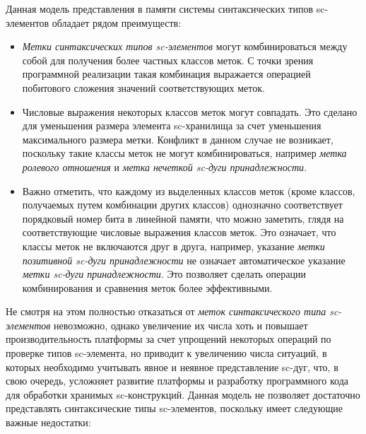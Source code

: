 Данная модель представления в памяти системы синтаксических типов sc-элементов обладает рядом преимуществ:
\begin{itemize}
    \item \textit{Метки синтаксических типов sc-элементов} могут комбинироваться между собой для получения более
    частных классов меток. С точки зрения программной реализации такая комбинация выражается операцией побитового
    сложения значений соответствующих меток.
    \item Числовые выражения некоторых классов меток могут совпадать. Это сделано для уменьшения размера элемента
    sc-хранилища за счет уменьшения максимального размера метки. Конфликт в данном случае не возникает, поскольку такие
    классы меток не могут комбинироваться, например \textit{метка ролевого отношения} и
    \textit{метка нечеткой sc-дуги принадлежности}.
    \item Важно отметить, что каждому из выделенных классов меток (кроме классов, получаемых путем комбинации других
    классов) однозначно соответствует порядковый номер бита в линейной памяти, что можно заметить, глядя на
    соответствующие числовые выражения классов меток. Это означает, что классы меток не включаются друг в друга, например,
    указание \textit{метки позитивной sc-дуги принадлежности} не означает автоматическое указание \textit{метки sc-дуги
    принадлежности}. Это позволяет сделать операции комбинирования и сравнения меток более эффективными.
\end{itemize}

Не смотря на этом полностью отказаться от \textit{меток синтаксического типа sc-элементов} невозможно, однако увеличение
их числа хоть и повышает производительность платформы за счет упрощений некоторых операций по проверке типов sc-элемента,
но приводит к увеличению числа ситуаций, в которых необходимо учитывать явное и неявное представление sc-дуг, что,
в свою очередь, усложняет развитие платформы и разработку программного кода для обработки хранимых sc-конструкций.
Данная модель не позволяет достаточно представлять синтаксические типы sc-элементов, поскольку имеет следующие важные
недостатки:

